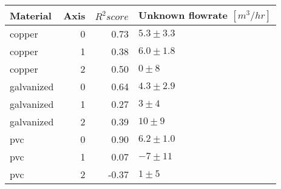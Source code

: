 \begin{tabular}{lrrl}
\toprule
\textbf{Material} & \textbf{Axis} & \textbf{$R^2 score$} & \textbf{Unknown flowrate $[m^3 / hr]$} \\
\midrule
copper & 0 & 0.73 & $5.3 \pm 3.3$ \\
copper & 1 & 0.38 & $6.0 \pm 1.8$ \\
copper & 2 & 0.50 & $0 \pm 8$ \\
galvanized & 0 & 0.64 & $4.3 \pm 2.9$ \\
galvanized & 1 & 0.27 & $3 \pm 4$ \\
galvanized & 2 & 0.39 & $10 \pm 9$ \\
pvc & 0 & 0.90 & $6.2 \pm 1.0$ \\
pvc & 1 & 0.07 & $-7 \pm 11$ \\
pvc & 2 & -0.37 & $1 \pm 5$ \\
\bottomrule
\end{tabular}
